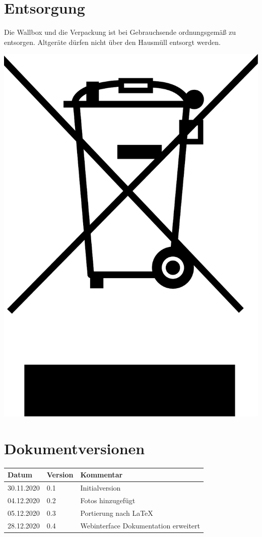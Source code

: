 \documentclass[a4paper,10pt]{article}
\begin{document}
\begin{multicols*}{2}
	\section{Entsorgung}
	Die Wallbox und die Verpackung ist bei Gebrauchsende ordnungsgemäß zu
	entsorgen. Altgeräte dürfen nicht über den Hausmüll entsorgt werden.

	\includegraphics[width=0.2\linewidth]{./img/resized/weee.pdf}

	\section{Dokumentversionen}
	\begin{tabular}{lll}
		\toprule
		Datum      & Version & Kommentar              \\
		\midrule
		30.11.2020 & 0.1     & Initialversion         \\
		04.12.2020 & 0.2     & Fotos hinzugefügt      \\
		05.12.2020 & 0.3     & Portierung nach \LaTeX \\
		28.12.2020 & 0.4     & Webinterface Dokumentation erweitert \\
		\bottomrule
	\end{tabular}

\end{multicols*}

\end{document}
